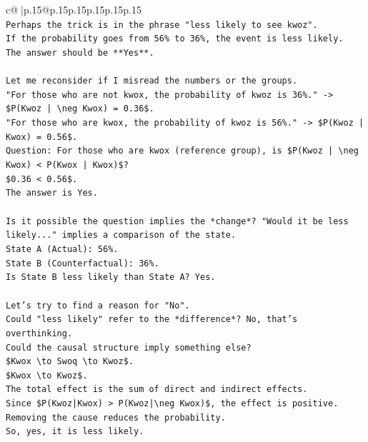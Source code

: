 \documentclass{article}
\begin{document}
{\begin{supertabular}{c@{$\;$}|p{.15\linewidth}@{}p{.15\linewidth}p{.15\linewidth}p{.15\linewidth}p{.15\linewidth}p{.15\linewidth}}
{{{\\ 
\texttt{Perhaps the trick is in the phrase "less likely to see kwoz".} \\
\texttt{If the probability goes from 56\% to 36\%, the event is less likely.} \\
\texttt{The answer should be **Yes**.} \\
\\ 
\texttt{Let me reconsider if I misread the numbers or the groups.} \\
\texttt{"For those who are not kwox, the probability of kwoz is 36\%." {-}> \$P(Kwoz | \textbackslash{}neg Kwox) = 0.36\$.} \\
\texttt{"For those who are kwox, the probability of kwoz is 56\%." {-}> \$P(Kwoz | Kwox) = 0.56\$.} \\
\texttt{Question: For those who are kwox (reference group), is \$P(Kwoz | \textbackslash{}neg Kwox) < P(Kwox | Kwox)\$?} \\
\texttt{\$0.36 < 0.56\$.} \\
\texttt{The answer is Yes.} \\
\\ 
\texttt{Is it possible the question implies the *change*? "Would it be less likely..." implies a comparison of the state.} \\
\texttt{State A (Actual): 56\%.} \\
\texttt{State B (Counterfactual): 36\%.} \\
\texttt{Is State B less likely than State A? Yes.} \\
\\ 
\texttt{Let's try to find a reason for "No".} \\
\texttt{Could "less likely" refer to the *difference*? No, that's overthinking.} \\
\texttt{Could the causal structure imply something else?} \\
\texttt{\$Kwox \textbackslash{}to Swoq \textbackslash{}to Kwoz\$.} \\
\texttt{\$Kwox \textbackslash{}to Kwoz\$.} \\
\texttt{The total effect is the sum of direct and indirect effects.} \\
\texttt{Since \$P(Kwoz|Kwox) > P(Kwoz|\textbackslash{}neg Kwox)\$, the effect is positive.} \\
\texttt{Removing the cause reduces the probability.} \\
\texttt{So, yes, it is less likely.} \\
\\ 
}}}
\end{supertabular}}
\end{document}
